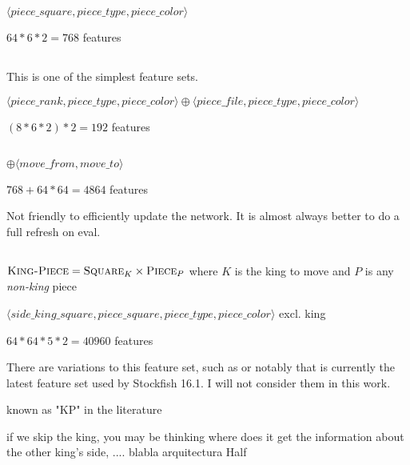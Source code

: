 $\langle piece\_square, piece\_type, piece\_color \rangle$

$64*6*2=768$ features


\subsection{\mdseries{}}

This is one of the simplest feature sets.

$\langle piece\_rank, piece\_type, piece\_color \rangle \oplus \langle piece\_file, piece\_type, piece\_color \rangle$

$(8*6*2)*2=192$ features

\subsection{\mdseries{}}

 $\oplus \langle move\_from, move\_to \rangle$

$768 + 64*64=4864$ features

Not friendly to efficiently update the network. It is almost always better to do a full refresh on eval.

\subsection{\mdseries{}}

$\textsc{King-Piece} = \textsc{Square}_{K} \times \textsc{Piece}_{P}$ where $K$ is the king to move and $P$ is any \textit{non-king} piece

$\langle side\_king\_square, piece\_square, piece\_type, piece\_color \rangle$ excl. king

$64*64*5*2=40960$ features

There are variations to this feature set, such as  or notably  that is currently the latest feature set used by Stockfish 16.1. I will not consider them in this work.

known as "KP" in the literature

if we skip the king, you may be thinking where does it get the information about the other king's side, .... blabla arquitectura Half

\subsection{\mdseries{}}


